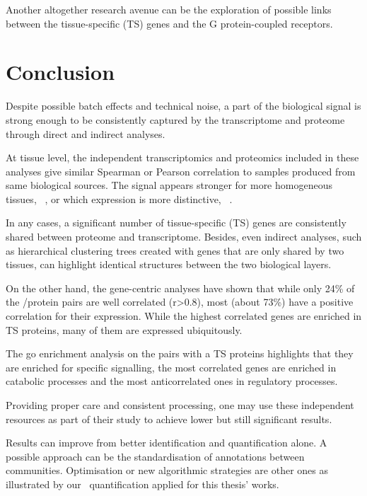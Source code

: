Another altogether research avenue can be the exploration of possible links
between the tissue-specific (\gls{TS}) genes and the G protein-coupled receptors.\mybr\

\section{Conclusion}

Despite possible batch effects and technical noise,
a part of the biological signal is strong enough
to be consistently captured by the transcriptome and proteome
through direct and indirect analyses.\mybr\

At tissue level,
the independent transcriptomics and proteomics included in these analyses
give similar Spearman or Pearson correlation
to samples produced from same biological sources.
The signal appears stronger for more homogeneous tissues, \eg\ \liver,
or which expression is more distinctive, \eg\ \testis{}.\mybr\

In any cases, a significant number of tissue-specific (\gls{TS}) genes
are consistently shared between proteome and transcriptome.
Besides, even indirect analyses,
such as hierarchical clustering trees
created with genes that are only shared by two tissues,
can highlight identical structures between the two biological layers.\mybr\

On the other hand, the gene-centric analyses have shown that
while only 24\% of the \mRNA/protein pairs are well correlated (r>$0.8$),
most (about 73\%) have a positive correlation for their expression.
While the highest correlated genes are enriched in \gls{TS} proteins,
many of them are expressed ubiquitously.\mybr\

The \gls{go} enrichment analysis on the pairs with a \gls{TS} proteins
highlights that they are enriched for specific signalling,
the most correlated genes are enriched in catabolic processes and
the most anticorrelated ones in regulatory processes.\mybr\

Providing proper care and consistent processing,
one may use these independent resources as part of their study
to achieve lower but still significant results.\mybr\

Results can improve from better identification and quantification alone.
A possible approach can be the standardisation of annotations between communities.
Optimisation or new algorithmic strategies are other ones
as illustrated by our \PPKM\ quantification applied for this thesis' works.\mybr\
